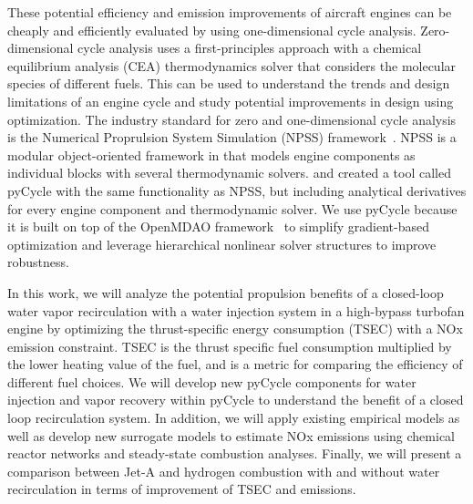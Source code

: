 \documentclass[conf]{new-aiaa}
\begin{document}
These potential efficiency and emission improvements of aircraft engines can be cheaply and efficiently evaluated by using one-dimensional cycle analysis.
Zero-dimensional cycle analysis uses a first-principles approach with a chemical equilibrium analysis (CEA) thermodynamics solver that considers the molecular species of different fuels.
This can be used to understand the trends and design limitations of an engine cycle and study potential improvements in design using optimization.
The industry standard for zero and one-dimensional cycle analysis is the Numerical Proprulsion System Simulation (NPSS) framework~\cite{JonesNPSS}.
NPSS is a modular object-oriented framework in that models engine components as individual blocks with several thermodynamic solvers.
\citet{Hendricks2019} and \citet{Gray2017b} created a tool called pyCycle with the same functionality as NPSS, but including analytical derivatives for every engine component and thermodynamic solver.
We use pyCycle because it is built on top of the OpenMDAO framework~\cite{Gray2019a} to simplify gradient-based optimization and leverage hierarchical nonlinear solver structures to improve robustness.

In this work, we will analyze the potential propulsion benefits of a closed-loop water vapor recirculation with a water injection system in a high-bypass turbofan engine by optimizing the thrust-specific energy consumption (TSEC) with a NOx emission constraint.
TSEC is the thrust specific fuel consumption multiplied by the lower heating value of the fuel, and is a metric for comparing the efficiency of different fuel choices.
We will develop new pyCycle components for water injection and vapor recovery within pyCycle to understand the benefit of a closed loop recirculation system.
In addition, we will apply existing empirical models as well as develop new surrogate models to estimate NOx emissions using chemical reactor networks and steady-state combustion analyses.
Finally, we will present a comparison between Jet-A and hydrogen combustion with and without water recirculation in terms of improvement of TSEC and emissions.
\end{document}

